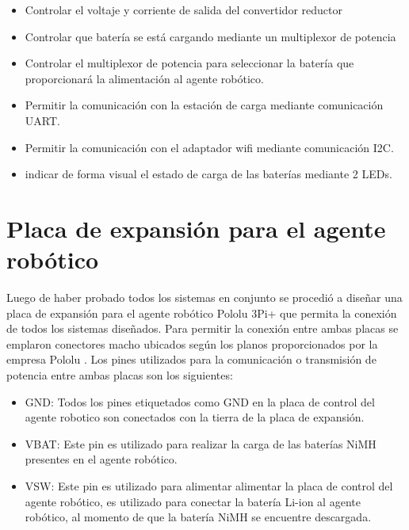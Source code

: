     \begin{itemize}
        \item Controlar el voltaje y corriente de salida del convertidor reductor
        \item Controlar que batería se está cargando mediante un multiplexor de potencia
        \item Controlar el multiplexor de potencia para seleccionar la batería
        que proporcionará la alimentación al agente robótico.
        \item Permitir la comunicación con la estación de carga mediante comunicación
        UART.
        \item  Permitir la comunicación con el adaptador wifi mediante comunicación
        I2C.
        \item indicar de forma visual el estado de carga de las baterías mediante
        2 LEDs.
    \end{itemize}


    \section{Placa de expansión para el agente robótico}

        Luego de haber probado todos los sistemas en conjunto se procedió a diseñar
        una placa de expansión para el agente robótico Pololu 3Pi+ que permita
        la conexión de todos los sistemas diseñados. Para permitir la conexión
         entre ambas placas se emplaron conectores 
        macho ubicados según los planos proporcionados por la empresa Pololu \cite{noauthor_pololu_nodate}.
        Los pines utilizados para la comunicación o transmisión de potencia entre
        ambas placas son los siguientes:

        \begin{itemize}
            \item GND: Todos los pines etiquetados como GND en la placa de control
            del agente robotico son conectados con la tierra de la placa de expansión.
            \item VBAT: Este pin es utilizado para realizar la carga de las baterías
            NiMH presentes en el agente robótico.
            \item VSW: Este pin es utilizado para alimentar alimentar la placa de 
            control del agente robótico, es utilizado para conectar la batería Li-ion
            al agente robótico, al momento de que la batería NiMH se encuentre descargada.

        \end{itemize}

